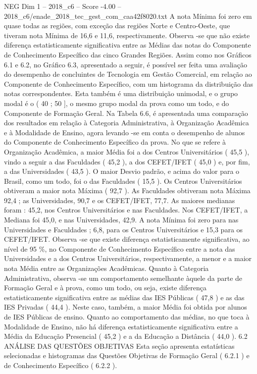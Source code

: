 \begin{textsample}{NEG Dim 1 – 2018\_c6 – Score -4.00 – 2018\_c6/enade\_2018\_tec\_gest\_com\_caa42f8020.txt}
A nota Mínima foi zero em quase todas as regiões, com exceção das regiões Norte e Centro-Oeste, que tiveram nota Mínima de 16,6 e 11,6, respectivamente.
Observa -se que não existe diferença estatisticamente significativa entre as Médias das notas do Componente de Conhecimento Específico das cinco Grandes Regiões.
Assim como nos Gráficos 6.1 e 6.2, no Gráfico 6.3, apresentado a seguir, é possível ser feita uma avaliação do desempenho de concluintes de Tecnologia em Gestão Comercial, em relação ao Componente de Conhecimento Específico, com um histograma da distribuição das notas correspondentes.
Esta também é uma distribuição unimodal, e o grupo modal é o ( 40 ; 50 ], o mesmo grupo modal da prova como um todo, e do Componente de Formação Geral.
Na Tabela 6.6, é apresentada uma comparação dos resultados em relação à Categoria Administrativa, à Organização Acadêmica e à Modalidade de Ensino, agora levando -se em conta o desempenho de alunos do Componente de Conhecimento Específico da prova.
No que se refere à Organização Acadêmica, a maior Média foi a dos Centros Universitários ( 45,5 ), vindo a seguir a das Faculdades ( 45,2 ), a dos CEFET/IFET ( 45,0 ) e, por fim, a das Universidades ( 43,5 ).
O maior Desvio padrão, e acima do valor para o Brasil, como um todo, foi o das Faculdades ( 15,5 ).
Os Centros Universitários obtiveram a maior nota Máxima ( 92,7 ).
As Faculdades obtiveram nota Máxima 92,4 ; as Universidades, 90,7 e os CEFET/IFET, 77,7.
As maiores medianas foram : 45,2, nos Centros Universitários e nas Faculdades.
Nos CEFET/IFET, a Mediana foi 45,0, e nas Universidades, 42,9.
A nota Mínima foi zero para nas Universidades e Faculdades ; 6,8, para os Centros Universitários e 15,3 para os CEFET/IFET.
Observa -se que existe diferença estatisticamente significativa, ao nível de 95 \%, no Componente de Conhecimento Específico entre a nota das Universidades e a dos Centros Universitários, respectivamente, a menor e a maior nota Média entre as Organizações Acadêmicas.
Quanto à Categoria Administrativa, observa -se um comportamento semelhante àquele da parte de Formação Geral e à prova, como um todo, ou seja, existe diferença estatisticamente significativa entre as médias das IES Públicas ( 47,8 ) e as das IES Privadas ( 44,4 ).
Neste caso, também, a maior Média foi obtida por alunos de IES Públicas de ensino.
Quanto ao comportamento das médias, no que toca à Modalidade de Ensino, não há diferença estatisticamente significativa entre a Média da Educação Presencial ( 45,2 ) e a da Educação a Distância ( 44,0 ). 6.2 ANÁLISE DAS QUESTÕES OBJETIVAS Esta seção apresenta estatísticas selecionadas e histogramas das Questões Objetivas de Formação Geral ( 6.2.1 ) e de Conhecimento Específico ( 6.2.2 ).

\end{textsample}
